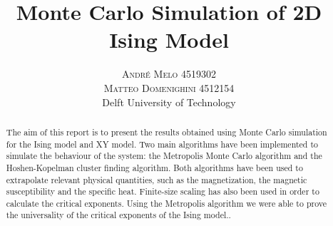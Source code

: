 \documentclass[twoside]{article}
\title{\vspace{-15mm}\fontsize{24pt}{10pt}\selectfont\textbf{Monte Carlo Simulation of 2D Ising Model}} %
\author{
\large
\textsc{Andr\'e Melo 4519302}\\
\textsc{Matteo Domenighini 4512154} \\[2mm] %
\normalsize Delft University of Technology\\ %
\vspace{-5mm}
}
\date{}
\begin{document}
\maketitle %


\begin{abstract}

\noindent The aim of this report is to present the results obtained using Monte Carlo simulation for the Ising model and XY model. Two main algorithms have been implemented to simulate the behaviour of the system: the Metropolis Monte Carlo algorithm and the Hoshen-Kopelman cluster finding algorithm. Both algorithms have been used to extrapolate relevant physical quantities, such as the magnetization, the magnetic susceptibility and the specific heat. Finite-size scaling has also been used in order to calculate the critical exponents. Using the Metropolis algorithm we were able to prove the universality of the critical exponents of the Ising model..%

\end{abstract}

\end{document}
